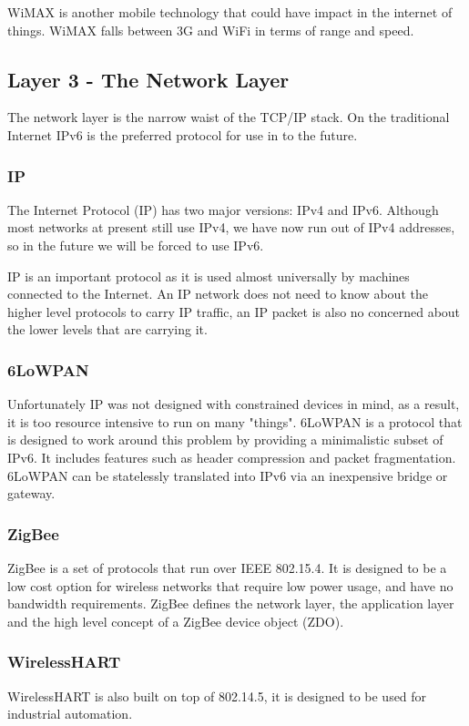 \documentclass[10pt,journal,compsoc]{IEEEtran}
\begin{document}
WiMAX is another mobile technology that could have impact in the internet of
things. WiMAX falls between 3G and WiFi in terms of range and speed.  

\subsection{Layer 3 - The Network Layer}
The network layer is the narrow waist of the TCP/IP stack. On the traditional
Internet IPv6 is the preferred protocol for use in to the future.

\subsubsection{IP}
The Internet Protocol (IP) has two major versions: IPv4 and IPv6. Although most
networks at present still use IPv4, we have now run out of IPv4 addresses, so
in the future we will be forced to use IPv6.

IP is an important protocol as it is used almost universally by machines
connected to the Internet. An IP network does not need to know about the higher
level protocols to carry IP traffic, an IP packet is also no concerned about
the lower levels that are carrying it. 

\subsubsection{6LoWPAN}
Unfortunately IP was not designed with constrained devices in mind, as a
result, it is too resource intensive to run on many "things". 6LoWPAN is a
protocol that is designed to work around this problem by providing a
minimalistic subset of IPv6. It includes features such as header compression
and packet fragmentation. 6LoWPAN can be statelessly translated into IPv6 via
an inexpensive bridge or gateway. 

\subsubsection{ZigBee}
ZigBee is a set of protocols that run over IEEE 802.15.4. It is designed to be a
low cost option for wireless networks that require low power usage, and have no
bandwidth requirements. ZigBee defines the network layer, the application layer
and the high level concept of a ZigBee device object (ZDO). 

\subsubsection{WirelessHART}
WirelessHART is also built on top of 802.14.5, it is designed to be used for
industrial automation. 
\end{document}
